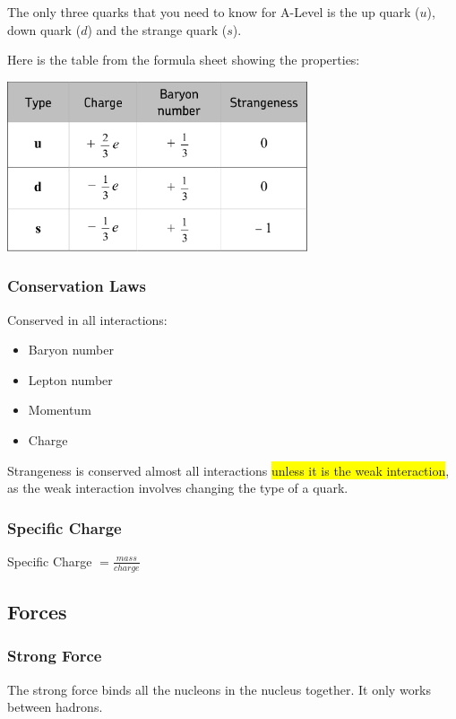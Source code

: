 \documentclass[a4paper, 12pt]{article}
\begin{document}
The only three quarks that you need to know for A-Level is the up quark ($u$), down quark ($d$) and the strange quark ($s$).

Here is the table from the formula sheet showing the properties:

\begin{center}
\includegraphics[height=5cm]{images/quarks.png}
\end{center}

\subsubsection{Conservation Laws}

Conserved in all interactions:
\begin{itemize}
	\item{Baryon number}
	\item{Lepton number}
	\item{Momentum}
	\item{Charge}
\end{itemize}

Strangeness is conserved almost all interactions \colorbox{yellow}{unless it is the weak interaction}, as the weak interaction involves changing the type of a quark.

\subsubsection{Specific Charge}

Specific Charge $= \frac{mass}{charge}$

\subsection{Forces}

\subsubsection{Strong Force}

The strong force binds all the nucleons in the nucleus together. It only works between hadrons.
\end{document}
